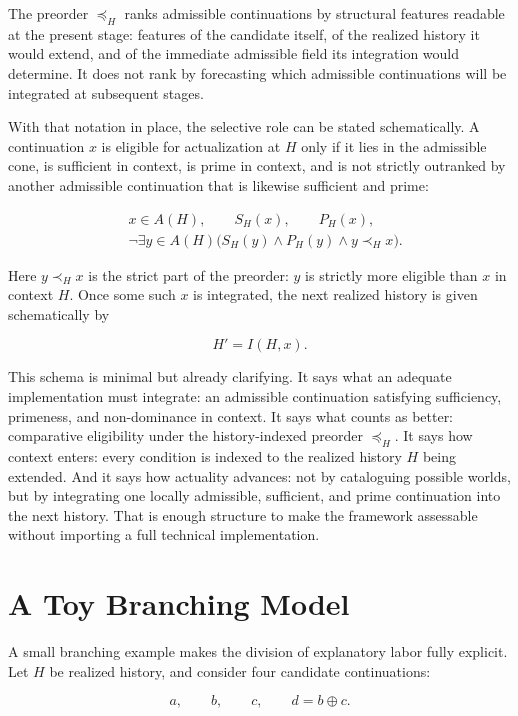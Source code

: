 \documentclass[11pt]{article}
\theoremstyle{foundation}
\begin{document}
The preorder $\preceq_H$ ranks admissible continuations by structural features readable at the present stage: features of the candidate itself, of the realized history it would extend, and of the immediate admissible field its integration would determine. It does not rank by forecasting which admissible continuations will be integrated at subsequent stages.

With that notation in place, the selective role can be stated schematically. A continuation $x$ is eligible for actualization at $H$ only if it lies in the admissible cone, is sufficient in context, is prime in context, and is not strictly outranked by another admissible continuation that is likewise sufficient and prime:

\[
\begin{aligned}
&x \in A(H), \qquad S_H(x), \qquad P_H(x),\\
&\neg \exists y \in A(H)\bigl(S_H(y) \wedge P_H(y) \wedge y \prec_H x\bigr).
\end{aligned}
\]

Here $y \prec_H x$ is the strict part of the preorder: $y$ is strictly more eligible than $x$ in context $H$. Once some such $x$ is integrated, the next realized history is given schematically by

\[
H' = I(H,x).
\]

This schema is minimal but already clarifying. It says what an adequate implementation must integrate: an admissible continuation satisfying sufficiency, primeness, and non-dominance in context. It says what counts as better: comparative eligibility under the history-indexed preorder $\preceq_H$. It says how context enters: every condition is indexed to the realized history $H$ being extended. And it says how actuality advances: not by cataloguing possible worlds, but by integrating one locally admissible, sufficient, and prime continuation into the next history. That is enough structure to make the framework assessable without importing a full technical implementation.

\section{A Toy Branching Model}

A small branching example makes the division of explanatory labor fully explicit. Let $H$ be realized history, and consider four candidate continuations:

\[
a, \qquad b, \qquad c, \qquad d = b \oplus c.
\]
\end{document}
